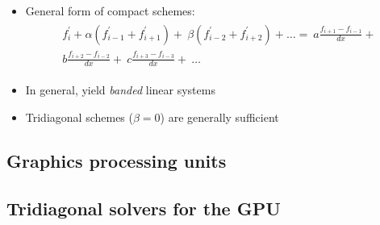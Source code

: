 \begin{frame}
    \begin{itemize}
    \item {General form of compact schemes:
    \begin{align*}
        \begin{split}
            f_i^{\prime} + \alpha(f^{\prime}_{i-1} + f^{\prime}_{i+1}) + \
            \beta(f^{\prime}_{i-2} + f^{\prime}_{i+2}) + \hdots  = \
            a\frac{f_{i+1} - f_{i-1}}{dx} + \\
            b\frac{f_{i+2} - f_{i-2}}{dx} + \
            c\frac{f_{i+3} - f_{i-3}}{dx} + \
            \hdots
        \end{split}
    \end{align*}}
    \item In general, yield \emph{banded} linear systems
    \item Tridiagonal schemes ($\beta=0$) are generally sufficient
    \end{itemize}
\end{frame}

\subsection{Graphics processing units}

\subsection{Tridiagonal solvers for the GPU}
\subsection{}

